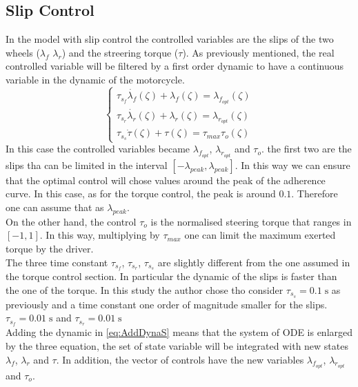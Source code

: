 \subsection{Slip Control}
%
In the model with slip control the controlled variables are the slips of the two wheels ($\lambda_f$ $\lambda_r$) and the streering torque ($\tau$). As previously mentioned, the real controlled variable will be filtered by a first order dynamic to have a continuous variable in the dynamic of the motorcycle.
%
\begin{equation}
    \begin{cases}
        \tau_{s_f} \dot{\lambda_f}(\zeta) + {\lambda_f}(\zeta) = {\lambda_{f_{opt}}}(\zeta)\\
        \tau_{s_r} \dot{\lambda_r}(\zeta) + {\lambda_r}(\zeta) = {\lambda_{r_{opt}}}(\zeta)\\
        \tau_{s_s} \dot{\tau}(\zeta) + \tau(\zeta) = \tau_{max} \tau_o(\zeta)
    \end{cases}
    \label{eq:AddDynaS}
\end{equation}
%
In this case the controlled variables became ${\lambda_{f_{opt}}}$, ${\lambda_{r_{opt}}}$ and $\tau_o$. the first two are the slips tha can be limited in the interval $[-\lambda_{peak},\lambda_{peak}]$. In this way we can ensure that the optimal control will chose values around the peak of the adherence curve. In this case, as for the torque control, the peak is around $0.1$. Therefore one can assume that as $\lambda_{peak}$.\\
On the other hand, the control $\tau_o$ is the normalised steering torque that ranges in $[-1,1]$. In this way, multiplying by $\tau_{max}$ one can limit the maximum exerted torque by the driver.\\
The three time constant $\tau_{s_f}$, $\tau_{s_r}$, $\tau_{s_s}$ are slightly different from the one assumed in the torque control section. In particular the dynamic of the slips is faster than the one of the torque. In this study the author chose tho consider $\tau_{s_s} = 0.1 \; \si{\second}$ as previously and a time constant one order of magnitude smaller for the slips.  $\tau_{s_f} = 0.01 \; \si{\second}$ and $\tau_{s_r} = 0.01 \; \si{\second}$\\
Adding the dynamic in \ref{eq:AddDynaS} means that the system of ODE is enlarged by the three equation, the set of state variable will be integrated with new states $\lambda_f$, $\lambda_r$ and $\tau$. In addition, the vector of controls have the new variables $\lambda_{f_{opt}}$, $\lambda_{r_{opt}}$ and $\tau_o$.
% 